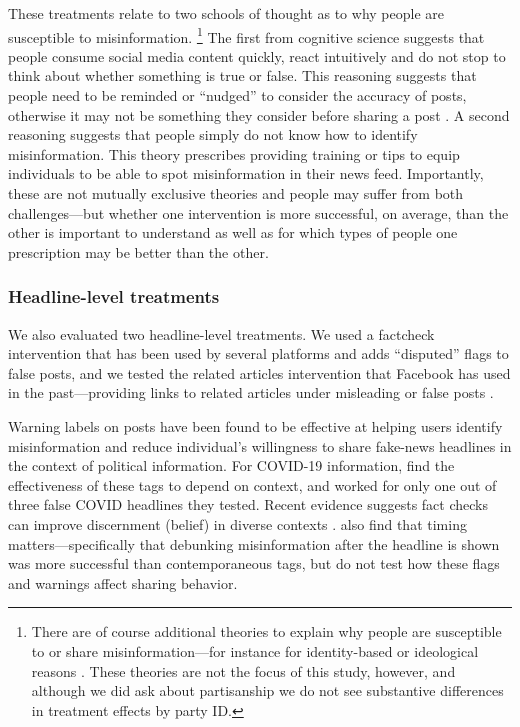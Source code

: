 \documentclass[letterpaper, 12pt, parskip=full,DIV=10]{scrartcl}
\begin{document}
These treatments relate to two schools of thought as to why people are susceptible to misinformation.%
\footnote{
 There are of course additional theories to explain why people are susceptible to or share misinformation---for instance for identity-based or ideological reasons \citep{nyhan2010corrections}. These theories are not the focus of this study, however, and although we did ask about partisanship we do not see substantive differences in treatment effects by party ID.%
}
The first from cognitive science suggests that people consume social media content quickly, react intuitively and do not stop to think about whether something is true or false. This reasoning suggests that people need to be reminded or ``nudged'' to consider the accuracy of posts, otherwise it may not be something they consider before sharing a post \citep{pennycook2021shifting}. A second reasoning suggests that people simply do not know how to identify misinformation. This theory prescribes providing training or tips to equip individuals to be able to spot misinformation in their news feed. Importantly, these are not mutually exclusive theories and people may suffer from both challenges---but whether one intervention is more successful, on average, than the other is important to understand as well as for which types of people one prescription may be better than the other. 

\subsubsection{Headline-level treatments}
We also evaluated two headline-level treatments. We used a factcheck intervention that has been used by several platforms and adds ``disputed'' flags to false posts, and we tested the related articles intervention that Facebook has used in the past---providing links to related articles under misleading or false posts \citep{ghosh2017facebook}.

Warning labels on posts have been found to be effective at helping users identify misinformation \citep{clayton2020real} and reduce individual's willingness to share fake-news headlines \citep{mena2020cleaning} in the context of political information. For COVID-19 information, \citet{kreps2020medical} find the effectiveness of these tags to depend on context, and worked for only one out of three false COVID headlines they tested. Recent evidence suggests fact checks can improve discernment (belief) in diverse contexts \citep{porter2021global}. \citet{brashier2021timing} also find that timing matters---specifically that debunking misinformation after the headline is shown was more successful than contemporaneous tags, but do not test how these flags and warnings affect sharing behavior. 
\end{document}
